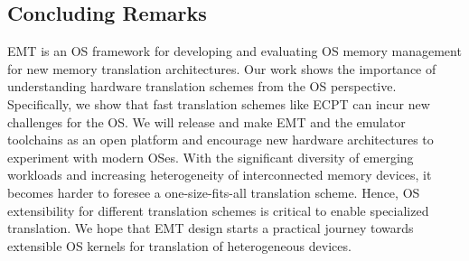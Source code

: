 \subsection{Concluding Remarks}
\label{emt:sec:conclusion}

\noindent
EMT is an OS framework for developing and evaluating
    OS memory management for new memory translation architectures.
Our work shows the importance of understanding
    hardware translation schemes from the OS perspective.
Specifically, we show that fast translation schemes like ECPT 
    can incur new challenges for the OS.
We will release and make EMT and the emulator toolchains 
    as an open platform and encourage new hardware architectures
    to experiment with modern OSes.
With the significant diversity of emerging workloads
    and increasing heterogeneity of interconnected memory devices,
    it becomes harder to foresee a one-size-fits-all translation scheme.
Hence, OS extensibility for different translation schemes 
    is critical to enable %
    specialized translation.
We hope that EMT design starts a practical 
    journey towards extensible OS kernels for translation of heterogeneous devices.



